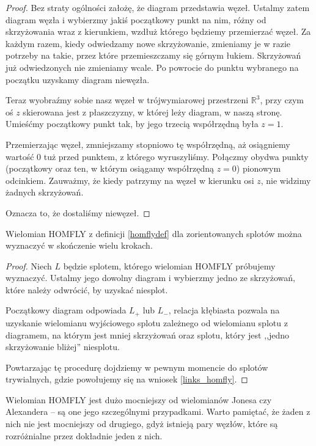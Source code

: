 \begin{proof}
Bez straty ogólności założę, że diagram przedstawia węzeł.
Ustalmy zatem diagram węzła i wybierzmy jakiś początkowy punkt na nim, różny od skrzyżowania wraz z kierunkiem, wzdłuż którego będziemy przemierzać węzeł.
Za każdym razem, kiedy odwiedzamy nowe skrzyżowanie, zmieniamy je w razie potrzeby na takie, przez które przemieszczamy się górnym łukiem.
Skrzyżowań już odwiedzonych nie zmieniamy wcale.
Po powrocie do punktu wybranego na początku uzyskamy diagram niewęzła.

Teraz wyobraźmy sobie nasz węzeł w trójwymiarowej przestrzeni $\mathbb R^3$, przy czym oś $z$ skierowana jest z płaszczyzny, w której leży diagram, w naszą stronę.
Umieśćmy początkowy punkt tak, by jego trzecią współrzędną była $z = 1$.

Przemierzając węzeł, zmniejszamy stopniowo tę współrzędną, aż osiągniemy wartość $0$ tuż przed punktem, z którego wyruszyliśmy.
Połączmy obydwa punkty (początkowy oraz ten, w którym osiągamy współrzędną $z = 0$) pionowym odcinkiem.
Zauważmy, że kiedy patrzymy na węzeł w kierunku osi $z$, nie widzimy żadnych skrzyżowań.

Oznacza to, że dostaliśmy niewęzeł.
\end{proof}

\begin{proposition}
    Wielomian HOMFLY z definicji \ref{homflydef} dla zorientowanych splotów można wyznaczyć w skończenie wielu krokach.
\end{proposition}

\begin{proof}
    Niech $L$ będzie splotem, którego wielomian HOMFLY próbujemy wyznaczyć.
    Ustalmy jego dowolny diagram i wybierzmy jedno ze skrzyżowań, które należy odwrócić, by uzyskać niesplot.
    
    Początkowy diagram odpowiada $L_+$ lub $L_-$, relacja kłębiasta pozwala na uzyskanie wielomianu wyjściowego splotu zależnego od wielomianu splotu z 
    diagramem, na którym jest mniej skrzyżowań oraz splotu, który jest ,,jedno skrzyżowanie bliżej'' niesplotu.
    
    Powtarzając tę procedurę dojdziemy w pewnym momencie do splotów trywialnych, gdzie powołujemy się na wniosek \ref{links_homfly}.
\end{proof}

Wielomian HOMFLY jest dużo mocniejszy od wielomianów Jonesa czy Alexandera -- są one jego szczególnymi przypadkami.
Warto pamiętać, że żaden z nich nie jest mocniejszy od drugiego, gdyż istnieją pary węzłów, które są rozróżnialne przez dokładnie jeden z nich.

